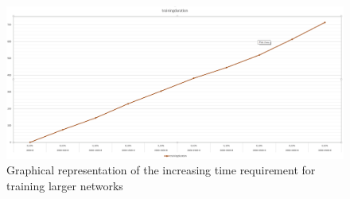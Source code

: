 \documentclass[pdftex,a4paper,12pt,twoside]{report}
\theoremstyle{plain} \newtheorem{theorem}{Theorem} \newtheorem{proposition}{Proposition} \newtheorem{lemma}{Lemma} \newtheorem*{corollary}{Corollary}
\theoremstyle{definition} \newtheorem{definition}{Definition} \newtheorem{conjecture}{Conjecture} \newtheorem*{example}{Example} \newtheorem{algorithm}{Algorithm}
\theoremstyle{remark} \newtheorem*{remark}{Remark} \newtheorem*{note}{Note} \newtheorem{case}{Case}
\begin{document}
\begin{figure}
\centering
\includegraphics[angle=90,scale=0.45]{./img/Trainingduration.png}
\caption{Graphical representation of the increasing time requirement for training larger networks}
\label{fig:trainingduration}
\end{figure}
\end{document}

